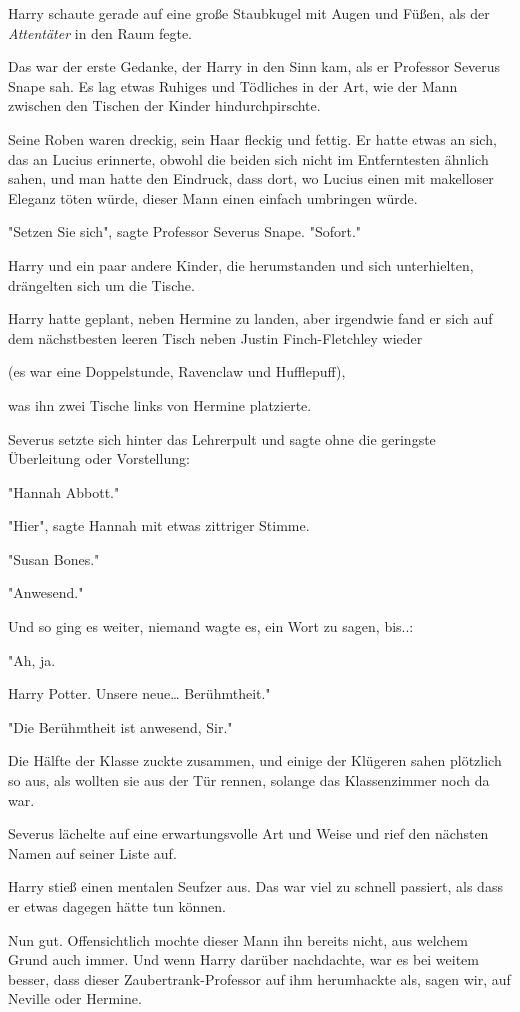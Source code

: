 {Harry schaute gerade auf eine große Staubkugel mit Augen und Füßen, als der \emph{Attentäter} in den Raum fegte.

Das war der erste Gedanke, der Harry in den Sinn kam, als er Professor Severus Snape sah. Es lag etwas Ruhiges und Tödliches in der Art, wie der Mann zwischen den Tischen der Kinder hindurchpirschte.

Seine Roben waren dreckig, sein Haar fleckig und fettig. Er hatte etwas an sich, das an Lucius erinnerte, obwohl die beiden sich nicht im Entferntesten ähnlich sahen, und man hatte den Eindruck, dass dort, wo Lucius einen mit makelloser Eleganz töten würde, dieser Mann einen einfach umbringen würde.

"Setzen Sie sich", sagte Professor Severus Snape. "Sofort."

Harry und ein paar andere Kinder, die herumstanden und sich unterhielten, drängelten sich um die Tische.

Harry hatte geplant, neben Hermine zu landen, aber irgendwie fand er sich auf dem nächstbesten leeren Tisch neben Justin Finch-Fletchley wieder

(es war eine Doppelstunde, Ravenclaw und Hufflepuff),

was ihn zwei Tische links von Hermine platzierte.

Severus setzte sich hinter das Lehrerpult und sagte ohne die geringste Überleitung oder Vorstellung:

"Hannah Abbott."

"Hier", sagte Hannah mit etwas zittriger Stimme.

"Susan Bones."

"Anwesend."

Und so ging es weiter, niemand wagte es, ein Wort zu sagen, bis..:

"Ah, ja.

Harry Potter. Unsere neue… Berühmtheit."

"Die Berühmtheit ist anwesend, Sir."

Die Hälfte der Klasse zuckte zusammen, und einige der Klügeren sahen plötzlich so aus, als wollten sie aus der Tür rennen, solange das Klassenzimmer noch da war.

Severus lächelte auf eine erwartungsvolle Art und Weise und rief den nächsten Namen auf seiner Liste auf.

Harry stieß einen mentalen Seufzer aus. Das war viel zu schnell passiert, als dass er etwas dagegen hätte tun können.

Nun gut. Offensichtlich mochte dieser Mann ihn bereits nicht, aus welchem Grund auch immer. Und wenn Harry darüber nachdachte, war es bei weitem besser, dass dieser Zaubertrank-Professor auf ihm herumhackte als, sagen wir, auf Neville oder Hermine.

}

